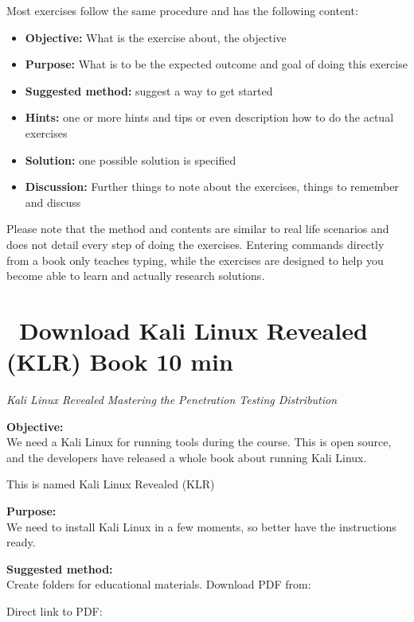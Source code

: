 \documentclass[a4paper,11pt,notitlepage]{report}
\begin{document}
Most exercises follow the same procedure and has the following content:
\begin{itemize}
\item {\bf Objective:} What is the exercise about, the objective
\item {\bf Purpose:} What is to be the expected outcome and goal of doing this exercise
\item {\bf Suggested method:} suggest a way to get started
\item {\bf Hints:} one or more hints and tips or even description how to
do the actual exercises
\item {\bf Solution:} one possible solution is specified
\item {\bf Discussion:} Further things to note about the exercises, things to remember and discuss
\end{itemize}

Please note that the method and contents are similar to real life scenarios and does not detail every step of doing the exercises. Entering commands directly from a book only teaches typing, while the exercises are designed to help you become able to learn and actually research solutions.


\chapter{\faExclamationTriangle\ Download Kali Linux Revealed (KLR) Book 10 min}
\label{ex:downloadKLR}



\emph{Kali Linux Revealed  Mastering the Penetration Testing Distribution}


{\bf Objective:}\\
We need a Kali Linux for running tools during the course. This is open source, and the developers have released a whole book about running Kali Linux.

This is named Kali Linux Revealed (KLR)

{\bf Purpose:}\\
We need to install Kali Linux in a few moments, so better have the instructions ready.

{\bf Suggested method:}\\
Create folders for educational materials. Download PDF from:

Direct link to PDF:
\\
\end{document}

